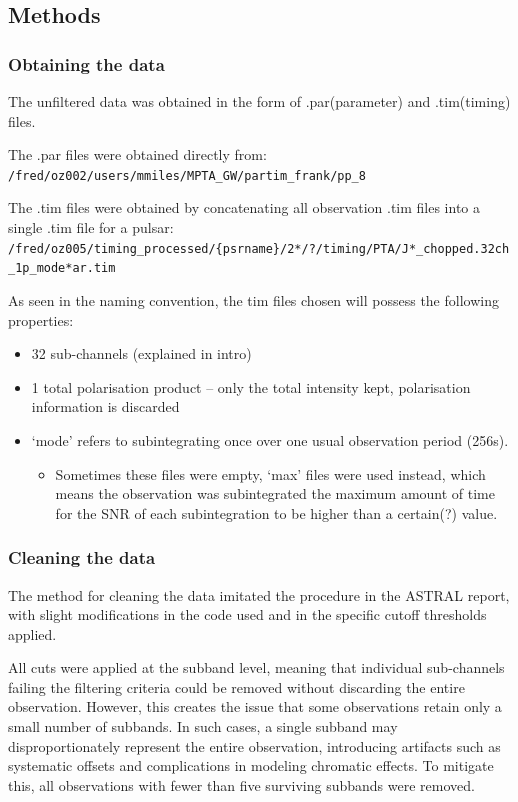 \documentclass[12pt,a4paper]{article}
\begin{document}
\subsection{Methods}

\subsubsection{Obtaining the data}
The unfiltered data was obtained in the form of .par(parameter) and .tim(timing) files.

The .par files were obtained directly from: \texttt{/fred/oz002/users/mmiles/MPTA\_GW/partim\_frank/pp\_8}

The .tim files were obtained by concatenating all observation .tim files into a single .tim file for a pulsar: \texttt{/fred/oz005/timing\_processed/\{psrname\}/2*/?/timing/PTA/J*\_chopped.32ch\_1p\_mode*ar.tim}

As seen in the naming convention, the tim files chosen will possess the following properties:
\begin{itemize}
  \item 32 sub-channels (explained in intro)
  \item 1 total polarisation product -- only the total intensity kept, polarisation information is discarded
  \item `mode' refers to subintegrating once over one usual observation period (256s).
    \begin{itemize}
      \item Sometimes these files were empty, `max' files were used instead, which means the observation was subintegrated the maximum amount of time for the SNR of each subintegration to be higher than a certain(?) value.
    \end{itemize}
\end{itemize}

\subsubsection{Cleaning the data}
The method for cleaning the data imitated the procedure in the ASTRAL report, with slight modifications in the code used and in the specific cutoff thresholds applied.

All cuts were applied at the subband level, meaning that individual sub-channels failing the filtering criteria could be removed without discarding the entire observation. However, this creates the issue that some observations retain only a small number of subbands. In such cases, a single subband may disproportionately represent the entire observation, introducing artifacts such as systematic offsets and complications in modeling chromatic effects. To mitigate this, all observations with fewer than five surviving subbands were removed.
\end{document}
